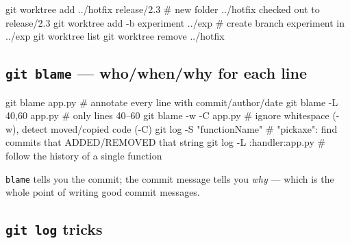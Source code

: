 \documentclass[11pt]{article}
\newenvironment{Shaded}{\begin{snugshade}}{\end{snugshade}}
\newcommand{\AttributeTok}[1]{\textcolor[rgb]{0.16,0.50,0.73}{#1}}
\newcommand{\CommentTok}[1]{\textcolor[rgb]{0.48,0.49,0.49}{#1}}
\newcommand{\FunctionTok}[1]{\textcolor[rgb]{0.56,0.27,0.68}{#1}}
\newcommand{\NormalTok}[1]{\textcolor[rgb]{0.81,0.81,0.76}{#1}}
\newcommand{\StringTok}[1]{\textcolor[rgb]{0.96,0.31,0.31}{#1}}
\begin{document}
\begin{Shaded}
\begin{Highlighting}[]
\FunctionTok{git}\NormalTok{ worktree add ../hotfix release/2.3   }\CommentTok{\# new folder ../hotfix checked out to release/2.3}
\FunctionTok{git}\NormalTok{ worktree add }\AttributeTok{{-}b}\NormalTok{ experiment ../exp    }\CommentTok{\# create branch \textquotesingle{}experiment\textquotesingle{} in ../exp}
\FunctionTok{git}\NormalTok{ worktree list}
\FunctionTok{git}\NormalTok{ worktree remove ../hotfix}
\end{Highlighting}
\end{Shaded}

\subsection{\texorpdfstring{\texttt{git\ blame} --- who/when/why for each line}{git blame --- who/when/why for each line}}\label{git-blame--whowhenwhy-for-each-line}


\begin{Shaded}
\begin{Highlighting}[]
\FunctionTok{git}\NormalTok{ blame app.py                  }\CommentTok{\# annotate every line with commit/author/date}
\FunctionTok{git}\NormalTok{ blame }\AttributeTok{{-}L}\NormalTok{ 40,60 app.py         }\CommentTok{\# only lines 40–60}
\FunctionTok{git}\NormalTok{ blame }\AttributeTok{{-}w} \AttributeTok{{-}C}\NormalTok{ app.py            }\CommentTok{\# ignore whitespace ({-}w), detect moved/copied code ({-}C)}
\FunctionTok{git}\NormalTok{ log }\AttributeTok{{-}S} \StringTok{"functionName"}         \CommentTok{\# "pickaxe": find commits that ADDED/REMOVED that string}
\FunctionTok{git}\NormalTok{ log }\AttributeTok{{-}L}\NormalTok{ :handler:app.py        }\CommentTok{\# follow the history of a single function}
\end{Highlighting}
\end{Shaded}

\texttt{blame} tells you the commit; the commit message tells you \emph{why} --- which is the whole point of writing good commit messages.

\subsection{\texorpdfstring{\texttt{git\ log} tricks}{git log tricks}}\label{git-log-tricks}

\end{document}
